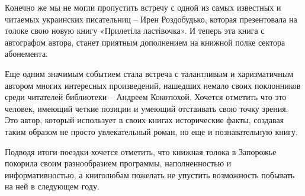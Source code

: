 Конечно же мы не могли пропустить встречу с одной из самых известных и читаемых
украинских писательниц – Ирен Роздобудько, которая презентовала на толоке свою
новую книгу «Прилетіла ластівочка». И теперь эта книга с автографом автора,
станет приятным дополнением на книжной полке сектора абонемента.

Еще одним значимым событием стала встреча с талантливым и харизматичным автором
многих интересных произведений, нашедших немало своих поклонников среди
читателей библиотеки – Андреем Кокотюхой. Хочется отметить что это человек,
имеющий четкие позиции и умеющий отстаивать свою точку зрения. Это автор,
который использует в своих книгах исторические факты, создавая таким образом не
просто увлекательный роман, но еще и познавательную книгу. 

Подводя итоги поездки хочется отметить, что книжная толока в Запорожье покорила
своим разнообразием программы, наполненностью и информативностью, а книголюбам
пожелать не упустить возможность побывать на ней в следующем году.
